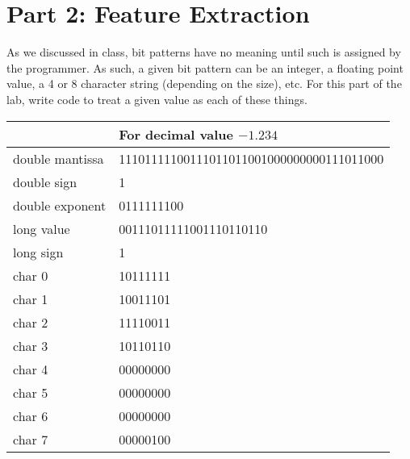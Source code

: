 \documentclass[letterpaper,12pt,titlepage]{article}
\begin{document}


\newpage
\section*{Part 2: Feature Extraction}
As we discussed in class, bit patterns have no meaning until such is assigned by the programmer. As such, a given bit pattern can be an integer, a floating point value, a 4 or 8 character string (depending on the size), etc. For this part of the lab, write code to treat a given value as each of these things.

\begin{center}
\begin{tabular} {| l | l | }
\hline
\multicolumn{2}{|c|}{\textbf{For decimal value $-1.234$}} \\
\hline
double mantissa & 11101111100111011011001000000000111011000 \\
double sign & 1 \\
double exponent & 0111111100\\
long value & 00111011111001110110110\\
long sign & 1\\
char 0 & 10111111\\ 
char 1 & 10011101\\ 
char 2 & 11110011\\ 
char 3 & 10110110\\ 
char 4 & 00000000\\ 
char 5 & 00000000\\ 
char 6 & 00000000\\ 
char 7 & 00000100\\ \hline
\end{tabular}
\end{center}


\end{document}
